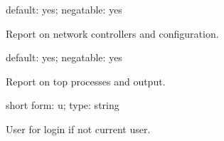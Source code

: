 \documentclass[letterpaper,10pt,english]{sphinxmanual}
\begin{document}
\begin{fulllineitems}
\label{\detokenize{mariadb-summary:cmdoption-mariadb-summary-summarize-network}}
\sphinxAtStartPar
default: yes; negatable: yes

\sphinxAtStartPar
Report on network controllers and configuration.

\end{fulllineitems}


\begin{fulllineitems}
\label{\detokenize{mariadb-summary:cmdoption-mariadb-summary-summarize-processes}}
\sphinxAtStartPar
default: yes; negatable: yes

\sphinxAtStartPar
Report on top processes and  output.

\end{fulllineitems}


\begin{fulllineitems}
\label{\detokenize{mariadb-summary:cmdoption-mariadb-summary-user}}
\sphinxAtStartPar
short form: \sphinxhyphen{}u; type: string

\sphinxAtStartPar
User for login if not current user.

\end{fulllineitems}
\end{document}

